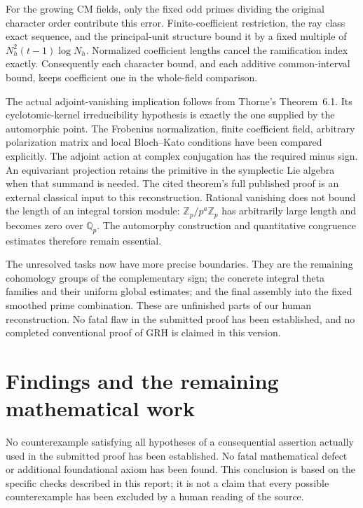 \documentclass[11pt,a4paper]{article}
\theoremstyle{remark}
\begin{document}
For the growing CM fields, only the fixed odd primes dividing
the original character order contribute this error. Finite-coefficient
restriction, the ray class exact sequence, and the principal-unit
structure bound it by a fixed multiple of
$N_h^2(t-1)\log N_h$\cite{milne-cft}. Normalized coefficient lengths
cancel the ramification index exactly. Consequently each character
bound, and each additive common-interval bound, keeps coefficient
one in the whole-field comparison.

The actual adjoint-vanishing implication follows from Thorne's
Theorem~6.1\cite{thorne-adjoint-2022}. Its cyclotomic-kernel
irreducibility hypothesis is exactly the one supplied by the
automorphic point. The Frobenius normalization, finite coefficient
field, arbitrary polarization matrix and local Bloch--Kato conditions
have been compared explicitly. The adjoint action at complex
conjugation has the required minus sign\cite{newton-thorne-adjoint-2023}.
An equivariant projection retains the primitive in the symplectic
Lie algebra when that summand is needed. The cited theorem's full
published proof is an external classical input to this reconstruction.
Rational vanishing does not bound the length of an integral torsion
module: $\mathbb Z_p/p^a\mathbb Z_p$ has arbitrarily large length
and becomes zero over $\mathbb Q_p$. The automorphy construction
and quantitative congruence estimates therefore remain essential.

The unresolved tasks now have more precise boundaries. They are
the remaining cohomology groups of the complementary sign; the concrete integral
theta families and their
uniform global estimates; and the final assembly into the fixed
smoothed prime combination. These are unfinished parts of our
human reconstruction. No fatal flaw in the submitted proof has
been established, and no completed conventional proof of GRH is
claimed in this version.


\section{Findings and the remaining mathematical work}
No counterexample satisfying all hypotheses of a consequential assertion
actually used in the submitted proof has been established. No fatal
mathematical defect or additional foundational axiom has been found.
This conclusion is based on the specific checks described in this report;
it is not a claim that every possible counterexample has been excluded
by a human reading of the source.
\end{document}
